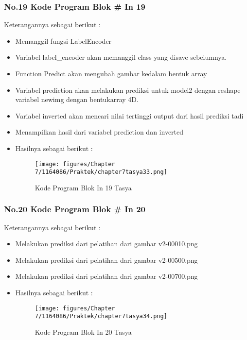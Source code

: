 \subsubsection{No.19 Kode Program Blok \# In 19}

Keterangannya sebagai berikut :
\begin{itemize}
\item Memanggil fungsi LabelEncoder
\item Variabel label\_encoder akan memanggil class yang disave sebelumnya.
\item Function Predict akan mengubah gambar kedalam bentuk array
\item Variabel prediction akan melakukan prediksi untuk model2 dengan reshape variabel newimg dengan bentukarray 4D.
\item Variabel inverted akan mencari nilai tertinggi output dari hasil prediksi tadi
\item Menampilkan hasil dari variabel prediction dan inverted
\item Hasilnya sebagai berikut :
\begin{figure}[ht]
\centering
\texttt{[image: figures/Chapter 7/1164086/Praktek/chapter7tasya33.png]}
\caption{Kode Program Blok In 19 Tasya}
\label{Praktek}
\end{figure}
\end{itemize}

\subsubsection{No.20 Kode Program Blok \# In 20}

Keterangannya sebagai berikut :
\begin{itemize}
\item Melakukan prediksi dari pelatihan dari gambar v2-00010.png
\item Melakukan prediksi dari pelatihan dari gambar v2-00500.png
\item Melakukan prediksi dari pelatihan dari gambar v2-00700.png
\item Hasilnya sebagai berikut :
\begin{figure}[ht]
\centering
\texttt{[image: figures/Chapter 7/1164086/Praktek/chapter7tasya34.png]}
\caption{Kode Program Blok In 20 Tasya}
\label{Praktek}
\end{figure}
\end{itemize}

